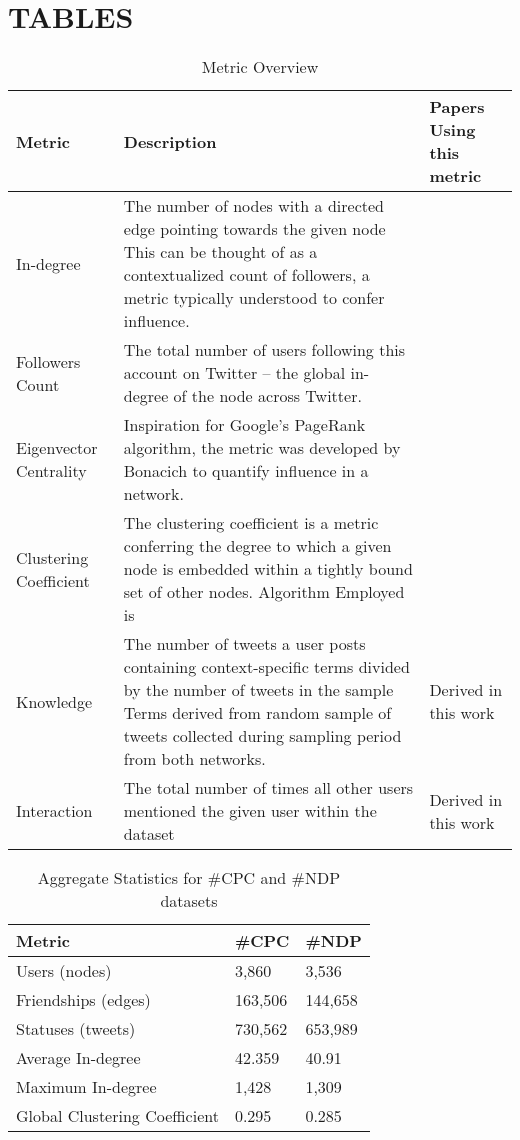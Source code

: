 \documentclass[a4paper,12pt]{article}
\begin{document}
\begin{table}[position specifier]
\section{TABLES}
  \centering
  \begin{tabular}{| p{2cm} | p{6cm} | p{6cm} |}
    \hline
    Metric & Description & Papers Using this metric \\ \hline
    In-degree & The number of nodes with a directed edge pointing towards the given node This can be thought of as a contextualized count of followers, a metric typically understood to confer influence. & \cite{Cha, JavaSongFininTseng2007, RomeroKleinberg2010} \\ \hline
    Followers Count & The total number of users following this account on Twitter -- the global in-degree of the node across Twitter. & \cite{MendoaPobleteCastillo2010, KwakLeeParkMoon2010, WuHofmanMasonWatts2011} \\ \hline
    Eigenvector Centrality & Inspiration for Google's PageRank algorithm, the metric was developed by Bonacich \citeyear{Bonacich1972} to quantify influence in a network. & \cite{WeitzelQuaresmadeOliveira2012, BigonhaCardosoMoroAlmeidaGoncalves2010} \\ \hline
    Clustering Coefficient & The clustering coefficient is a metric conferring the degree to which a given node is embedded within a tightly bound set of other nodes. Algorithm Employed is \cite{Latapy2008} & \cite{LermanGhosh2011, JavaSongFininTseng2007} \\ \hline
    Knowledge & The number of tweets a user posts containing context-specific terms divided by the number of tweets in the sample Terms derived from random sample of tweets collected during sampling period from both networks. & Derived in this work \\ \hline
    Interaction & The total number of times all other users mentioned the given user within the dataset & Derived in this work \\ \hline
    \hline
  \end{tabular}
  \caption{Metric Overview}
  \label{tab:metric_overview}
\end{table}

\begin{table}[position specifier]
  \centering
  \begin{tabular}{| l | l | l |}
    \hline
    Metric & \#CPC & \#NDP \\ \hline
    Users (nodes) & 3,860 & 3,536 \\ \hline
    Friendships (edges) & 163,506 & 144,658 \\ \hline
    Statuses (tweets) & 730,562 & 653,989 \\ \hline
    Average In-degree & 42.359 & 40.91 \\ \hline
    Maximum In-degree & 1,428 & 1,309 \\ \hline
    Global Clustering Coefficient & 0.295 & 0.285 \\ \hline
    \hline
  \end{tabular}
  \caption{Aggregate Statistics for \#CPC and \#NDP datasets}
  \label{tab:aggregate_dataset_stats}
\end{table}
\end{document}
